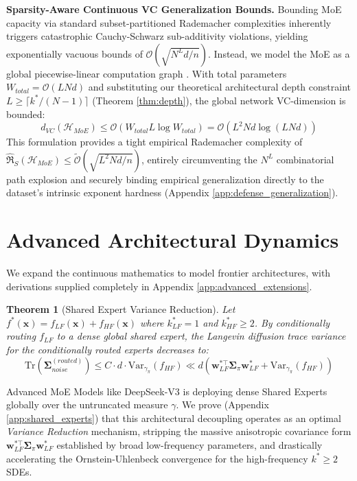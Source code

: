 \documentclass{article}
\newcommand{\1}{\mathbb{I}}
\newcommand{\calO}{\mathcal{O}}
\newcommand{\calH}{\mathcal{H}}
\newcommand{\bx}{\mathbf{x}}
\newcommand{\bw}{\mathbf{w}}
\newcommand{\bSigma}{\boldsymbol{\Sigma}}
\newcommand{\Tr}{\mathrm{Tr}}
\newcommand{\Var}{\mathrm{Var}}
\newtheorem{theorem}{Theorem}[section]
\begin{document}
\textbf{Sparsity-Aware Continuous VC Generalization Bounds.} Bounding MoE capacity via standard subset-partitioned Rademacher complexities inherently triggers catastrophic Cauchy-Schwarz sub-additivity violations, yielding exponentially vacuous bounds of $\calO(\sqrt{N^L d/n})$. Instead, we model the MoE as a global piecewise-linear computation graph \citep{bartlett2019nearly}. With total parameters $W_{total} = \calO(LNd)$ and substituting our theoretical architectural depth constraint $L \ge \lceil k^* / (N-1) \rceil$ (Theorem \ref{thm:depth}), the global network VC-dimension is bounded:
\begin{equation}
    d_{VC}(\calH_{MoE}) \le \calO(W_{total} L \log W_{total}) = \calO(L^2 N d \log(L N d))
\end{equation}
 This formulation provides a tight empirical Rademacher complexity of $\hat{\mathfrak{R}}_S(\calH_{MoE}) \le \tilde{\calO}\left( \sqrt{L^2 N d/n} \right)$, entirely circumventing the $N^L$ combinatorial path explosion and securely binding empirical generalization directly to the dataset's intrinsic exponent hardness (Appendix \ref{app:defense_generalization}).
\section{Advanced Architectural Dynamics}
\label{sec:advanced}

We expand the continuous mathematics to model frontier architectures, with derivations supplied completely in Appendix \ref{app:advanced_extensions}.

\begin{theorem}[Shared Expert Variance Reduction] \label{thm:shared_expert}
Let $f^*(\bx) = f_{LF}(\bx) + f_{HF}(\bx)$ where $k_{LF}^* = 1$ and $k_{HF}^* \ge 2$. By conditionally routing $f_{LF}$ to a dense global shared expert, the Langevin diffusion trace variance for the conditionally routed experts decreases to:
\begin{equation}
    \Tr(\bSigma_{noise}^{(routed)}) \le C \cdot d \cdot \Var_{\gamma_\pi}(f_{HF}) \ll d \left( \bw_{LF}^{*\top} \bSigma_\pi \bw_{LF}^* + \Var_{\gamma_\pi}(f_{HF}) \right)
\end{equation}
\end{theorem}
Advanced MoE Models like DeepSeek-V3 \citep{deepseek2024v3} is deploying dense Shared Experts globally over the untruncated measure $\gamma$. We prove (Appendix \ref{app:shared_experts}) that this architectural decoupling operates as an optimal \textit{Variance Reduction} mechanism, stripping the massive anisotropic covariance form $\bw_{LF}^{*\top} \bSigma_\pi \bw_{LF}^*$ established by broad low-frequency parameters, and drastically accelerating the Ornstein-Uhlenbeck convergence for the high-frequency $k^* \ge 2$ SDEs.
\end{document}

